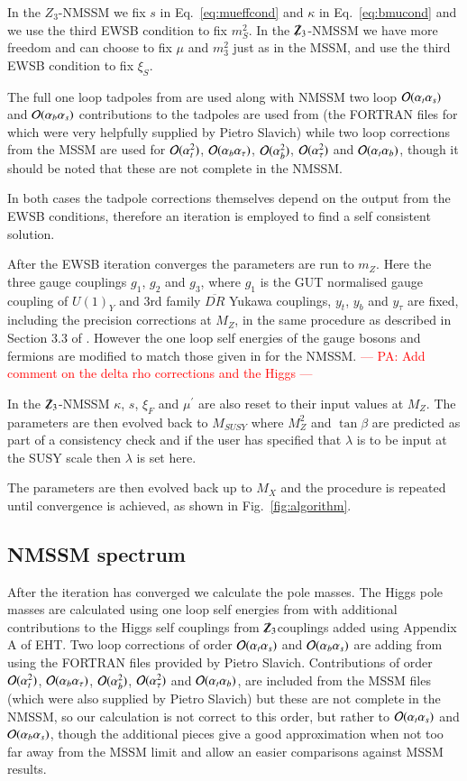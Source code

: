 \documentclass[final,3p,times,pdflatex]{elsarticle}
\newcommand{\Zv}{{\mbox{$\slashed{Z}_{3}$}}} %
\def\at{\alpha_t}
\def\ab{\alpha_b}
\def\as{\alpha_s}
\def\atau{\alpha_{\tau}}
\def\oatab{{\cal O}(\at\ab)}
\def\oatas{{\cal O}(\at\as)}
\def\oabas{{\cal O}(\ab\as)}
\def\oatq{{\cal O}(\at^2)}
\def\oabq{{\cal O}(\ab^2)}
\def\oatauq{{\cal O}(\atau^2)}
\def\oabatau{{\cal O}(\ab \atau)}
\begin{document}
In the $Z_3$-NMSSM we fix $s$ in Eq.~\ref{eq:mueffcond} and $\kappa$
in Eq.~\ref{eq:bmucond} and we use the third EWSB condition to fix
$m_S^2$.  In the \Zv-NMSSM we have more freedom and can choose to fix
$\mu$ and $m_3^2$ just as in the MSSM, and use the third EWSB
condition to fix $\xi_S$.

The full one loop tadpoles from \cite{Degrassi:2009yq} are used along
with NMSSM two loop $\oatas$ and $\oabas$ contributions to the
tadpoles are used from \cite{Degrassi:2009yq} (the FORTRAN files for
which were very helpfully supplied by Pietro Slavich) while two loop
corrections from the MSSM are used for $\oatq$, $\oabatau$, $\oabq$,
$\oatauq$ and $\oatab$, though it should be noted that these are not
complete in the NMSSM.
 
In both cases the tadpole corrections themselves depend on the output
from the EWSB conditions, therefore an iteration is employed to find a
self consistent solution.

After the EWSB iteration converges the parameters are run to $m_Z$.
Here the three gauge couplings $g_1$, $g_2$ and $g_3$, where $g_1$ is
the GUT normalised gauge coupling of $U(1)_Y$ and 3rd family
$\overline{DR}$ Yukawa couplings, $y_t$, $y_b$ and $y_\tau$ are fixed,
including the precision corrections at $M_Z$, in the same procedure as
described in Section 3.3 of \cite{Allanach:2001kg}.  However the one
loop self energies of the gauge bosons and fermions are modified to
match those given in \cite{Degrassi:2009yq} for the NMSSM.
\textcolor{red}{--- PA: Add comment on the delta rho corrections and
  the Higgs ---}

In the \Zv-NMSSM $\kappa$, $s$, $\xi_F$ and $\mu^\prime$ are also
reset to their input values at $M_Z$.  The parameters are then evolved
back to $M_{SUSY}$ where $M_Z^2$ and $\tan\beta$ are predicted as
part of a consistency check and if the user has specified that
$\lambda$ is to be input at the SUSY scale then $\lambda$ is set here.


The parameters are then evolved back up to $M_X$ and the procedure is repeated until convergence is achieved, as shown in Fig.~\ref{fig:algorithm}. 

\subsection{NMSSM spectrum \label{spec}}
After the iteration has converged we calculate the pole masses.  The
Higgs pole masses are calculated using one loop self energies from
\cite{Degrassi:2009yq} with additional contributions to the Higgs self
couplings from \Zv couplings added using Appendix A of
EHT\cite{Ellwanger:2009dp}.  Two loop corrections of order $\oatas$ and
$\oabas$ are adding from \cite{Degrassi:2009yq} using the FORTRAN
files provided by Pietro Slavich.  Contributions of order $\oatq$,
$\oabatau$, $\oabq$, $\oatauq$ and $\oatab$, are included from the
MSSM files (which were also supplied by Pietro Slavich) but these are
not complete in the NMSSM, so our calculation is not correct to this
order, but rather to $\oatas$ and $\oabas$, though the additional
pieces give a good approximation when not too far away from the MSSM
limit and allow an easier comparisons against MSSM results.
\end{document}
